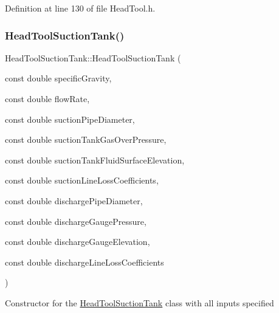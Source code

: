 Definition at line 130 of file Head\+Tool.\+h.

\mbox{\label{class_head_tool_suction_tank_a96579ecd414c723362db00cfeb24cd46}} 
\subsubsection{\texorpdfstring{Head\+Tool\+Suction\+Tank()}{HeadToolSuctionTank()}\hspace{0.1cm}{\footnotesize\ttfamily [3/3]}}
{\footnotesize\ttfamily Head\+Tool\+Suction\+Tank\+::\+Head\+Tool\+Suction\+Tank (\begin{DoxyParamCaption}\item[{const double}]{specific\+Gravity,  }\item[{const double}]{flow\+Rate,  }\item[{const double}]{suction\+Pipe\+Diameter,  }\item[{const double}]{suction\+Tank\+Gas\+Over\+Pressure,  }\item[{const double}]{suction\+Tank\+Fluid\+Surface\+Elevation,  }\item[{const double}]{suction\+Line\+Loss\+Coefficients,  }\item[{const double}]{discharge\+Pipe\+Diameter,  }\item[{const double}]{discharge\+Gauge\+Pressure,  }\item[{const double}]{discharge\+Gauge\+Elevation,  }\item[{const double}]{discharge\+Line\+Loss\+Coefficients }\end{DoxyParamCaption})\hspace{0.3cm}{\ttfamily [inline]}}

Constructor for the \hyperlink{class_head_tool_suction_tank}{Head\+Tool\+Suction\+Tank} class with all inputs specified


